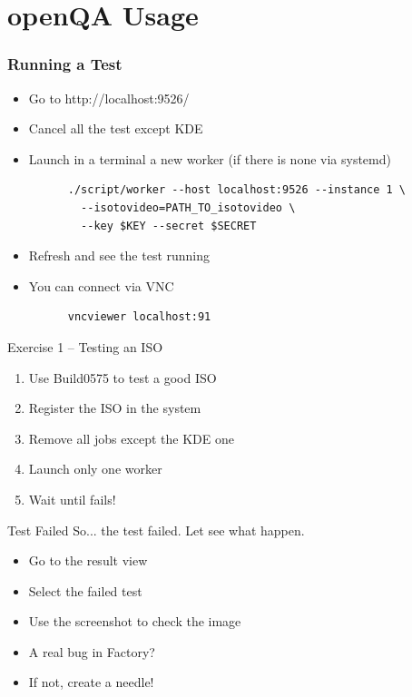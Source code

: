 \documentclass{beamer}
\begin{document}
\section{openQA Usage}
%
%
\begin{frame}[fragile]
  \frametitle{Running a Test}
  \begin{itemize}
  \item Go to http://localhost:9526/
  \item Cancel all the test except KDE
  \item Launch in a terminal a new worker (if there is none via systemd)
    \lstset{style=mybash}
    \begin{lstlisting}
      ./script/worker --host localhost:9526 --instance 1 \
        --isotovideo=PATH_TO_isotovideo \
        --key $KEY --secret $SECRET
    \end{lstlisting}
  \item Refresh and see the test running
  \item You can connect via VNC
    \lstset{style=mybash}
    \begin{lstlisting}
      vncviewer localhost:91
    \end{lstlisting}
  \end{itemize}
\end{frame}

%
%
\begin{frame}{Exercise 1 -- Testing an ISO}
  \begin{enumerate}
  \item Use Build0575 to test a good ISO
  \item Register the ISO in the system
  \item Remove all jobs except the KDE one
  \item Launch only one worker
  \item Wait until fails!
  \end{enumerate}
\end{frame}

%
%
\begin{frame}{Test Failed}
  So... the test failed. Let see what happen.
  \begin{itemize}
  \item Go to the result view
  \item Select the failed test
  \item Use the screenshot to check the image
  \item A real bug in Factory?
  \item If not, create a needle!
  \end{itemize}
\end{frame}
\end{document}
